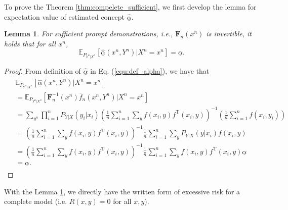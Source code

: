 \documentclass{article} %
\theoremstyle{plain} %
\newtheorem{lemma}[theorem]{Lemma}          %
\begin{document}
To prove the Theorem \ref{thm:compelete_sufficient}, we first develop the lemma for expectation value of estimated concept $\underline{\hat{\alpha}}$.
\begin{lemma}\label{lem:alpha_mean}
For sufficient prompt demonstrations, i.e., $\mathbf{F}_n(x^n)$ is invertible, it holds that for all $x^n$,
\begin{equation*}
    \mathbb{E}_{P_{Y^n|X^n}}[\underline{\hat{\alpha}}(x^n,Y^n) | X^n=x^n] = \underline{\alpha}.
\end{equation*}
\end{lemma}
\begin{proof}
From definition of $\underline{\hat{\alpha}}$ in Eq. (\ref{equ:def_alpha}), we have that
\begin{align*}
\begin{aligned}
& \mathbb{E}_{P_{Y^n|X^n}}\left[ \underline{\hat{\alpha}}(x^n, Y^n) | X^n = x^n \right]\\ 
& = \mathbb{E}_{P_{Y^n|X^n}}\left[ \mathbf{F}_n^{-1}(x^n) \bar{f}_n(x^n,Y^n)  | X^n=x^n\right]\\
& = \sum_{y^n} \prod_{i=1}^n P_{Y\vert X}(y_i\vert x_i) \left(\frac{1}{n}\sum_{i=1}^n \sum_{y}  f(x_i,y)f^{\mathrm{T}}(x_i,y)\right)^{-1} \left(\frac{1}{n}\sum_{i=1}^nf(x_i,y_i)\right)\\
& = \left(\frac{1}{n}\sum_{i=1}^n \sum_{y}  f(x_i,y)f^{\mathrm{T}}(x_i,y)\right)^{-1}  \frac1n \sum_{i=1}^n \sum_y P_{Y\vert X}(y\vert x_i) f(x_i,y)\\
& = \left(\frac{1}{n}\sum_{i=1}^n \sum_{y}  f(x_i,y)f^{\mathrm{T}}(x_i,y)\right)^{-1} \frac1n\sum_{i=1}^n \sum_y f(x_i,y) f^\mathrm{T}(x_i,y) \underline{\alpha}\\
&=\underline{\alpha}.
\end{aligned}
\end{align*}
\end{proof}

With the Lemma \ref{lem:alpha_mean}, we directly have the written form of excessive risk for a complete model (i.e. $R(x,y)=0$ for all $x,y$).
\end{document}
